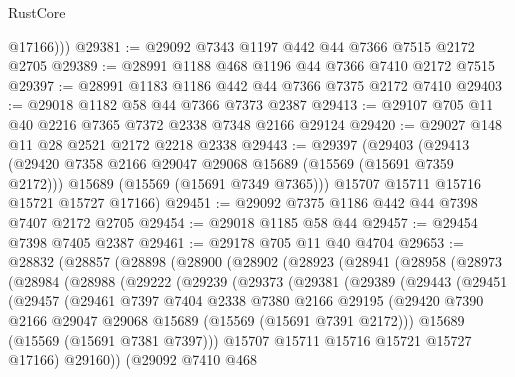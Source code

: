 \begin{lexlean}{RustCore}
\begin{coremodule}
          @17166)))
@29381 := @29092 @7343 @1197 @442 @44 @7366 @7515 @2172 @2705
@29389 := @28991 @1188 @468 @1196 @44 @7366 @7410 @2172 @7515
@29397 := @28991 @1183 @1186 @442 @44 @7366 @7375 @2172 @7410
@29403 := @29018 @1182 @58 @44 @7366 @7373 @2387
@29413 := @29107 @705 @11 @40 @2216 @7365 @7372 @2338 @7348 @2166 @29124
@29420 := @29027 @148 @11 @28 @2521 @2172 @2218 @2338
@29443 := @29397
    (@29403
      (@29413
        (@29420 @7358 @2166 @29047 @29068 @15689 (@15569 (@15691 @7359 @2172)))
        @15689
        (@15569 (@15691 @7349 @7365)))
      @15707
      @15711
      @15716
      @15721
      @15727
      @17166)
@29451 := @29092 @7375 @1186 @442 @44 @7398 @7407 @2172 @2705
@29454 := @29018 @1185 @58 @44
@29457 := @29454 @7398 @7405 @2387
@29461 := @29178 @705 @11 @40 @4704
@29653 := @28832
    (@28857
      (@28898
        (@28900
          (@28902
            (@28923
              (@28941
                (@28958
                  (@28973
                    (@28984
                      (@28988
                        (@29222
                          (@29239
                            (@29373
                              (@29381
                                (@29389
                                  (@29443
                                    (@29451
                                      (@29457
                                        (@29461
                                          @7397
                                          @7404
                                          @2338
                                          @7380
                                          @2166
                                          @29195
                                          (@29420
                                            @7390
                                            @2166
                                            @29047
                                            @29068
                                            @15689
                                            (@15569 (@15691 @7391 @2172)))
                                          @15689
                                          (@15569 (@15691 @7381 @7397)))
                                        @15707
                                        @15711
                                        @15716
                                        @15721
                                        @15727
                                        @17166)
                                      @29160))
                                  (@29092
                                    @7410
                                    @468

\end{coremodule}
\end{lexlean}

